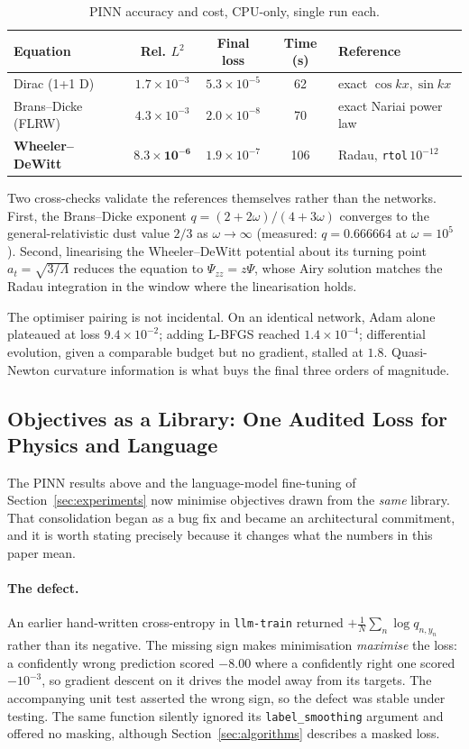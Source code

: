 \documentclass[11pt,a4paper]{article}
\theoremstyle{plain}
\theoremstyle{definition}
\begin{document}
\begin{table}[h]
\centering
\caption{PINN accuracy and cost, CPU-only, single run each.}
\begin{tabular}{lcccl}
\toprule
\textbf{Equation} & \textbf{Rel. $L^2$} & \textbf{Final loss} & \textbf{Time (s)} & \textbf{Reference} \\
\midrule
Dirac (1+1 D)        & $1.7\times10^{-3}$ & $5.3\times10^{-5}$ & 62 & exact $\cos kx,\sin kx$ \\
Brans--Dicke (FLRW)  & $4.3\times10^{-3}$ & $2.0\times10^{-8}$ & 70 & exact Nariai power law \\
\textbf{Wheeler--DeWitt} & $\mathbf{8.3\times10^{-6}}$ & $1.9\times10^{-7}$ & 106 & Radau, \texttt{rtol}\,$10^{-12}$ \\
\bottomrule
\end{tabular}
\label{tab:pinn}
\end{table}

Two cross-checks validate the references themselves rather than the networks.
First, the Brans--Dicke exponent $q=(2+2\omega)/(4+3\omega)$ converges to the
general-relativistic dust value $2/3$ as $\omega\to\infty$ (measured:
$q=0.666664$ at $\omega=10^{5}$). Second, linearising the Wheeler--DeWitt
potential about its turning point $a_t=\sqrt{3/\Lambda}$ reduces the equation
to $\Psi_{zz}=z\Psi$, whose Airy solution matches the Radau integration in the
window where the linearisation holds.

The optimiser pairing is not incidental. On an identical network, Adam alone
plateaued at loss $9.4\times10^{-2}$; adding L-BFGS reached
$1.4\times10^{-4}$; differential evolution, given a comparable budget but no
gradient, stalled at $1.8$. Quasi-Newton curvature information is what buys
the final three orders of magnitude.

\subsection{Objectives as a Library: One Audited Loss for Physics and Language}
\label{sec:objlib}

The PINN results above and the language-model fine-tuning of
Section~\ref{sec:experiments} now minimise objectives drawn from the
\emph{same} library. That consolidation began as a bug fix and became an
architectural commitment, and it is worth stating precisely because it changes
what the numbers in this paper mean.

\paragraph{The defect.} An earlier hand-written cross-entropy in
\texttt{llm-train} returned $+\frac1N\sum_n\log q_{n,y_n}$ rather than its
negative. The missing sign makes minimisation \emph{maximise} the loss: a
confidently wrong prediction scored $-8.00$ where a confidently right one
scored $-10^{-3}$, so gradient descent on it drives the model away from its
targets. The accompanying unit test asserted the wrong sign, so the defect was
stable under testing. The same function silently ignored its
\texttt{label\_smoothing} argument and offered no masking, although
Section~\ref{sec:algorithms} describes a masked loss.
\end{document}
